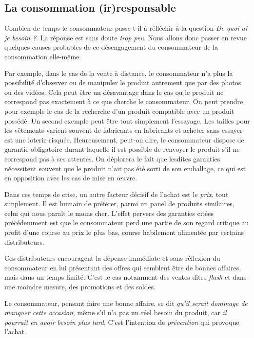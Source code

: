 \subsection{La consommation (ir)responsable}

Combien de temps le consommateur passe-t-il à réfléchir à la question \textit{De quoi ai-je besoin ?}.
La réponse est sans doute \textit{trop peu}. Nous allons donc passer en revue quelques causes probables de ce désengagement du consommateur de la consommation elle-même.

\medbreak
Par exemple, dans le cas de la vente à distance, le consommateur n'a plus la possibilité d'observer ou de manipuler le produit autrement que par des photos ou des vidéos.
Cela peut être un désavantage dans le cas ou le produit ne correspond pas exactement à ce que cherche le consommateur.
\medbreak
On peut prendre pour exemple le cas de la recherche d'un produit compatible avec un produit possédé.
Un second exemple peut être tout simplement l'essayage. Les tailles pour les vêtements varient souvent de fabricants en fabricants et acheter sans essayer est une loterie risquée.
\smallbreak
Heureusement, peut-on dire, le consommateur dispose de garantie obligatoire durant laquelle il est possible de renvoyer le produit s'il ne correspond pas à ses attentes. On déplorera le fait que lesdites garanties nécessitent souvent que le produit n'ait pas été sorti de son emballage, ce qui est en opposition avec les cas de mise en œuvre.

\medbreak
Dans ces temps de crise, un autre facteur décisif de l'achat est le \textit{prix}, tout simplement.
Il est humain de préférer, parmi un panel de produits similaires, celui qui nous paraît le moins cher.
L'effet pervers des garanties citées précédemment est que le consommateur perd une partie de son regard critique au profit d'une course au prix le plus bas, course habilement alimentée par certains distributeurs.

\smallbreak
Ces distributeurs encouragent la dépense immédiate et sans réflexion du consommateur en lui présentant des offres qui semblent être de bonnes affaires, mais dans un temps limité. C'est le cas notamment des ventes dites \textit{flash} et dans une moindre mesure, des promotions et des soldes.

\smallbreak
Le consommateur, pensant faire une bonne affaire, se dit \textit{qu'il serait dommage de manquer cette occasion}, même s'il n'a pas un réel besoin du produit, car \textit{il pourrait en avoir besoin plus tard}. C'est l'intention de \textit{prévention} qui provoque l'achat.

